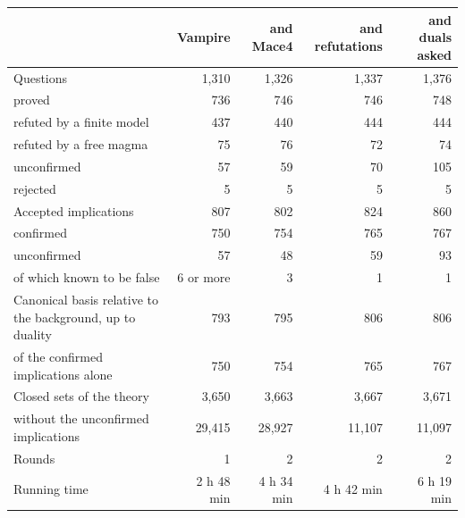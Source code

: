 \documentclass[11pt,a4paper]{article}
\theoremstyle{definition}
\theoremstyle{remark}
\begin{document}
\begin{table}[!htbp]
\centering
\small
\begin{tabularx}{\textwidth}{@{}Xrrrr@{}}
\toprule
 & Vampire & and Mace4 & and refutations & and duals asked \\
\midrule
Questions & 1,310 & 1,326 & 1,337 & 1,376 \\
\quad proved & 736 & 746 & 746 & 748 \\
\quad refuted by a finite model & 437 & 440 & 444 & 444 \\
\quad refuted by a free magma & 75 & 76 & 72 & 74 \\
\quad unconfirmed & 57 & 59 & 70 & 105 \\
\quad rejected & 5 & 5 & 5 & 5 \\
Accepted implications & 807 & 802 & 824 & 860 \\
\quad confirmed & 750 & 754 & 765 & 767 \\
\quad unconfirmed & 57 & 48 & 59 & 93 \\
\qquad of which known to be false & 6 or more & 3 & 1 & 1 \\
Canonical basis relative to the background, up to duality & 793 & 795 & 806 & 806 \\
\quad of the confirmed implications alone & 750 & 754 & 765 & 767 \\
Closed sets of the theory & 3,650 & 3,663 & 3,667 & 3,671 \\
\quad without the unconfirmed implications & 29,415 & 28,927 & 11,107 & 11,097 \\
Rounds & 1 & 2 & 2 & 2 \\
Running time & 2 h 48 min & 4 h 34 min & 4 h 42 min & 6 h 19 min \\
\bottomrule
\end{tabularx}

\end{table}
\end{document}
